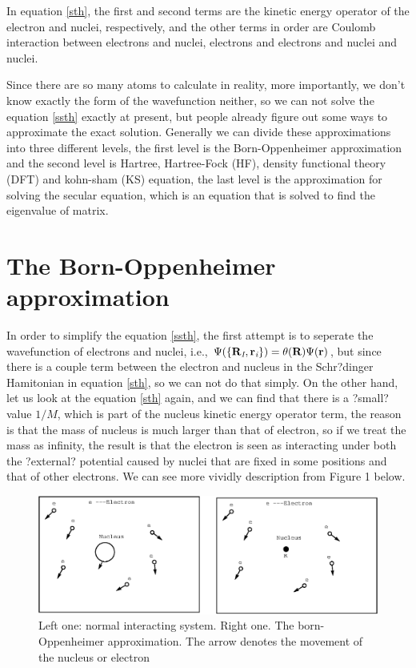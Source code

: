 \documentclass[a4paper, 12pt, titlepage,oneside,drop]{kthesis}
\begin{document}
\noindent In equation \ref{sth}, the first and second terms are the kinetic energy operator of the electron and nuclei, respectively,
and the other terms in order are Coulomb interaction between electrons and nuclei, electrons and electrons and nuclei and nuclei.

\noindent Since there are so many atoms to calculate in reality, more importantly, we don't know exactly the form of the wavefunction neither,
so we can not solve the equation \ref{ssth} exactly at present, but people already figure out some ways to approximate the exact solution. 
Generally we can divide these approximations into three different levels, the first level is the Born-Oppenheimer approximation and the second level is Hartree,
Hartree-Fock (HF), density functional theory (DFT) and kohn-sham (KS) equation, the last level is the approximation for solving the secular equation, which is an equation that is solved to find the eigenvalue of matrix.

\section{The Born-Oppenheimer approximation}
\label{ch:boa}
\noindent In order to simplify the equation  \ref{ssth}, the first attempt is to seperate the wavefunction of electrons and nuclei, i.e., 
$\Psi(\{\textbf{R}_\textit{I}, \textbf{r}_\textit{i} \}) = {\theta(\textbf{R})} {\Psi(\textbf{r})} $, but since there is a couple term between the electron and nucleus in the Schr?dinger Hamitonian in equation \ref{sth}, 
so we can not do that simply. On the other hand, let us look at the equation
\ref{sth} again, and we can find that there is a ?small? value ${1}/{M}$, which is part of the nucleus kinetic energy
operator term, the reason is that the mass of nucleus is much larger than that of electron, so if we treat the mass
as infinity, the result is that the electron is seen as interacting under both the ?external? potential caused by nuclei that are fixed in 
some positions and that of other electrons. We can see more vividly description from Figure 1 below.
\begin{figure}[!htb]
\centering
\includegraphics[scale=.5]{system.eps}
\caption{Left one: normal interacting system. Right one. The born-Oppenheimer approximation. The arrow denotes the movement of the nucleus or electron}
\label{fig:bo}
\end{figure}
\end{document}

